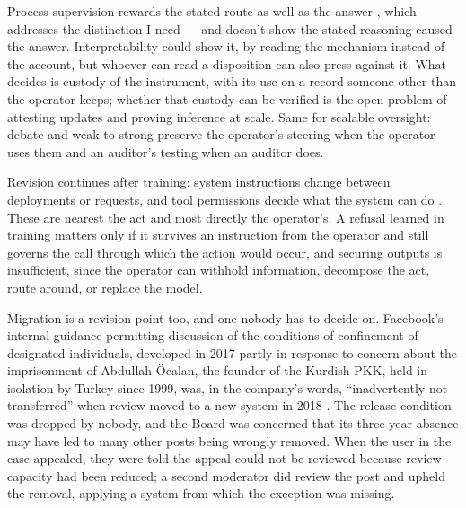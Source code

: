 Process supervision rewards the stated route as well as the answer \autocite{uesato2022solving}, which addresses the distinction I need — and doesn't show the stated reasoning caused the answer.
Interpretability could show it, by reading the mechanism instead of the account, but whoever can read a disposition can also press against it. What decides is custody of the instrument, with its use on a record someone other than the operator keeps; whether that custody can be verified is the open problem of attesting updates and proving inference at scale. Same for scalable oversight: debate and weak-to-strong \autocite{irving2018ai,burns2023weaktostrong} preserve the operator's steering when the operator uses them and an auditor's testing when an auditor does.


Revision continues after training: system instructions change between deployments or requests, and tool permissions decide what the system can do \autocite{schick2023toolformer}. These are nearest the act and most directly the operator's. A refusal learned in training matters only if it survives an instruction from the operator and still governs the call through which the action would occur, and securing outputs is insufficient, since the operator can withhold information, decompose the act, route around, or replace the model.

Migration is a revision point too, and one nobody has to decide on. Facebook's internal guidance permitting discussion of the conditions of confinement of designated individuals, developed in 2017 partly in response to concern about the imprisonment of Abdullah Öcalan, the founder of the Kurdish PKK, held in isolation by Turkey since 1999, was, in the company's words, “inadvertently not transferred” when review moved to a new system in 2018 \autocite{OversightBoard2021Ocalan}. The release condition was dropped by nobody, and the Board was concerned that its three-year absence may have led to many other posts being wrongly removed. When the user in the case appealed, they were told the appeal could not be reviewed because review capacity had been reduced; a second moderator did review the post and upheld the removal, applying a system from which the exception was missing.

